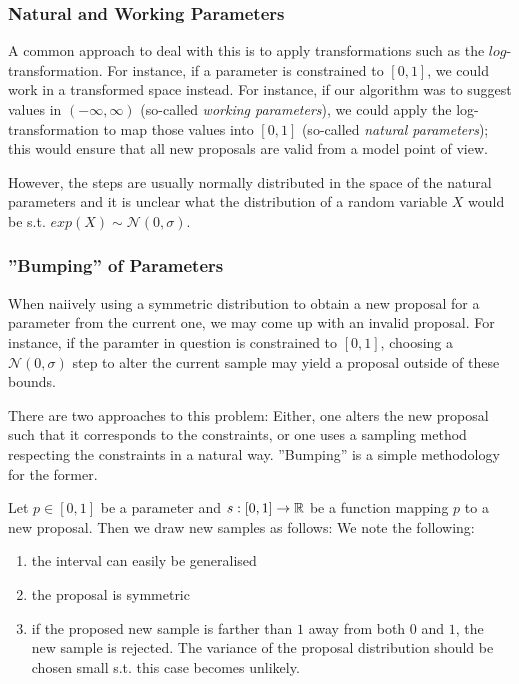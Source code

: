 \subsubsection*{Natural and Working Parameters}
A common approach to deal with this is to apply transformations such as the $log$-transformation. For instance, if a parameter is constrained to $[0,1]$, we could work in a transformed space instead. 
For instance, if our algorithm was to suggest values in $(-\infty, \infty)$ (so-called \textit{working parameters}), we could apply the log-transformation to map those values into $[0,1]$ (so-called \textit{natural parameters}); this would ensure that all new proposals are valid from a model point of view. 

However, the steps are usually normally distributed in the space of the natural parameters and it is unclear what the distribution of a random variable $X$ would be s.t. $exp(X) \sim \mathcal{N}(0, \sigma)$. 




\subsubsection*{''Bumping'' of Parameters}
When naiively using a symmetric distribution to obtain a new proposal for a parameter from the current one, we may come up with an invalid proposal. For instance, if the paramter in question is constrained to $[0,1]$, choosing a $\mathcal{N}(0, \sigma)$ step to alter the current sample may yield a proposal outside of these bounds.
 
There are two approaches to this problem: Either, one alters the new proposal such that it corresponds to the constraints, or one uses a sampling method respecting the constraints in a natural way. 
''Bumping'' is a simple methodology for the former. 

Let $p \in [0,1]$ be a parameter and $s: [0,1] \rightarrow \mathbb{R}$ be a function mapping $p$ to a new proposal. Then we draw new samples as follows:
We note the following:
\begin{enumerate}
	\item the interval can easily be generalised
	\item the proposal is symmetric
	\item if the proposed new sample is farther than $1$ away from both $0$ and $1$, the new sample is rejected. The variance of the proposal distribution should be chosen small s.t. this case becomes unlikely.
\end{enumerate}



